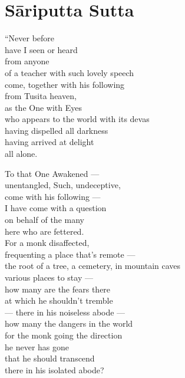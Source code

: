 \documentclass[
  babelLanguage=english,
  final,
  webversion,
]{chantingbook}
\begin{document}
\cleartoverso

\chapter*{Sāriputta Sutta}

\begin{leader}
\end{leader}

\enlargethispage{\baselineskip}

\englishText

``Never before\\
have I seen or heard\\
from anyone\\
of a teacher with such lovely speech\\
come, together with his following\\
from Tusita heaven,\\
as the One with Eyes\\
who appears to the world with its devas\\
having dispelled all darkness\\
having arrived at delight\\
\vin all alone.

To that One Awakened —\\
\vin unentangled, Such, undeceptive,\\
\vin come with his following —\\
I have come with a question\\
on behalf of the many\\
here who are fettered.\\
For a monk disaffected,\\
frequenting a place that's remote —\\
\vin the root of a tree, a cemetery, in mountain caves\\
\vin various places to stay —\\
how many are the fears there\\
at which he shouldn't tremble\\
\vin — there in his noiseless abode —\\
how many the dangers in the world\\
for the monk going the direction\\
\vin \vin he never has gone\\
that he should transcend\\
there in his isolated abode?
\end{document}
